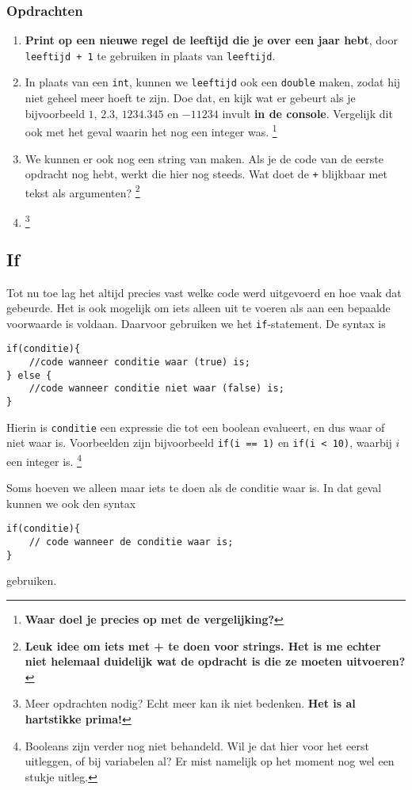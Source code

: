 \documentclass[12pt,a4paper]{article}
\newcommand{\icode}{\lstinline}
\begin{document}
\subsubsection{Opdrachten}
\begin{enumerate}
	\item \textbf{Print op een nieuwe regel de leeftijd die je over een jaar hebt}, door \icode{leeftijd + 1} te gebruiken in plaats van \icode{leeftijd}.
		\item
			In plaats van een \icode{int}, kunnen we \icode{leeftijd} ook een \icode{double} maken, zodat hij niet geheel meer hoeft te zijn. Doe dat, en kijk wat er gebeurt als je bijvoorbeeld $1$, $2.3$, $1234.345$ en $-11234$ invult \textbf{in de console}. Vergelijk dit ook met het geval waarin het nog een integer was. \footnote{\textbf{Waar doel je precies op met de vergelijking?}}
		\item
			We kunnen er ook nog een string van maken. Als je de code van de eerste opdracht nog hebt, werkt die hier nog steeds. Wat doet de \icode{+} blijkbaar met tekst als argumenten? \footnote{\textbf{Leuk idee om iets met + te doen voor strings. Het is me echter niet helemaal duidelijk wat de opdracht is die ze moeten uitvoeren?}}
		\item
			\footnote{Meer opdrachten nodig? Echt meer kan ik niet bedenken. \textbf{Het is al hartstikke prima!}}
\end{enumerate}


\subsection{If}
Tot nu toe lag het altijd precies vast welke code werd uitgevoerd en hoe vaak dat gebeurde. Het is ook mogelijk om iets alleen uit te voeren als aan een bepaalde voorwaarde is voldaan. Daarvoor gebruiken we het \icode{if}-statement. De syntax is
\begin{lstlisting}
if(conditie){
	//code wanneer conditie waar (true) is;
} else {
	//code wanneer conditie niet waar (false) is;
}
\end{lstlisting}
Hierin is \icode{conditie} een expressie die tot een boolean evalueert, en dus waar of niet waar is. Voorbeelden zijn bijvoorbeeld \icode{if(i == 1)} en \icode{if(i < 10)}, waarbij $i$ een integer is. \footnote{Booleans zijn verder nog niet behandeld. Wil je dat hier voor het eerst uitleggen, of bij variabelen al? Er mist namelijk op het moment nog wel een stukje uitleg.}

Soms hoeven we alleen maar iets te doen als de conditie waar is. In dat geval kunnen we ook den syntax
\begin{lstlisting}
if(conditie){
	// code wanneer de conditie waar is;
}
\end{lstlisting}
gebruiken.
\end{document}
